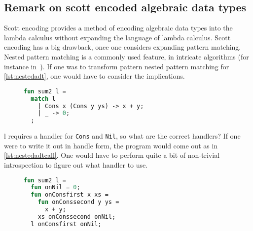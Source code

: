 \subsection{Remark on scott encoded algebraic data types}\label{sec:remscott}
Scott encoding provides a method of encoding algebraic data types into the lambda calculus without expanding the language of lambda calculus.
Scott encoding has a big drawback, once one considers expanding pattern matching.
Nested pattern matching is a commonly used feature, in intricate algorithms (for instance in~\cite{okasaki1999red}).
If one was to transform pattern nested pattern matching for \autoref{lst:nestedadt}, one would have to consider the implications.
\begin{figure}
\begin{lstlisting}[language=ML,caption={Nested pattern match},label={lst:nestedadt}]
fun sum2 l =
  match l
    | Cons x (Cons y ys) -> x + y;
    | _ -> 0;
  ;
\end{lstlisting}
\end{figure}
l requires a handler for \texttt{Cons} and \texttt{Nil}, so what are the correct handlers?
If one were to write it out in handle form, the program would come out as in \autoref{lst:nestedadtcall}.
One would have to perform quite a bit of non-trivial introspection to figure out what handler to use.
\begin{figure}
\begin{lstlisting}[language=ML,caption={Nested pattern match in handle form},label={lst:nestedadtcall}]
fun sum2 l =
  fun onNil = 0;
  fun onConsfirst x xs = 
    fun onConssecond y ys =
      x + y;
    xs onConssecond onNil;
  l onConsfirst onNil;
\end{lstlisting}
\end{figure}




